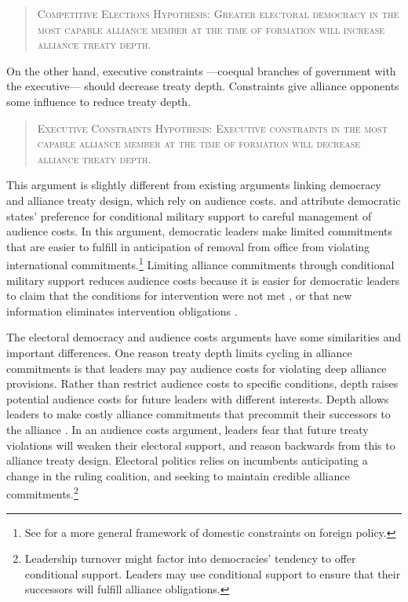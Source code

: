 \documentclass[12pt]{article}
\begin{document}
\begin{quote}
\textsc{Competitive Elections Hypothesis: Greater electoral democracy in the most capable alliance member at the time of formation will increase alliance treaty depth.}
\end{quote}   

On the other hand, executive constraints ---coequal branches of government with the executive--- should decrease treaty depth. 
Constraints give alliance opponents some influence to reduce treaty depth. 


\begin{quote}
\textsc{Executive Constraints Hypothesis: Executive constraints in the most capable alliance member at the time of formation will decrease alliance treaty depth.}
\end{quote}   


This argument is slightly different from existing arguments linking democracy and alliance treaty design, which rely on audience costs. 
\citet{Mattes2012} and \citet{Chibaetal2015} attribute democratic states' preference for conditional military support to careful management of audience costs. 
In this argument, democratic leaders make limited commitments that are easier to fulfill in anticipation of removal from office from violating international commitments.\footnote{See \citet{HydeSaunders2020} for a more general framework of domestic constraints on foreign policy.} 
Limiting alliance commitments through conditional military support reduces audience costs because it is easier for democratic leaders to claim that the conditions for intervention were not met \citep{FjelstulReiter2019}, or that new information eliminates intervention obligations \citep{LevenduskyHorowitz2012}. 


The electoral democracy and audience costs arguments have some similarities and important differences. 
One reason treaty depth limits cycling in alliance commitments is that leaders may pay audience costs for violating deep alliance provisions. 
Rather than restrict audience costs to specific conditions, depth raises potential audience costs for future leaders with different interests. 
Depth allows leaders to make costly alliance commitments that precommit their successors to the alliance \citep{Mattes2012a}. 
In an audience costs argument, leaders fear that future treaty violations will weaken their electoral support, and reason backwards from this to alliance treaty design. 
Electoral politics relies on incumbents anticipating a change in the ruling coalition, and seeking to maintain credible alliance commitments.\footnote{Leadership turnover might factor into democracies' tendency to offer conditional support. Leaders may use conditional support to ensure that their successors will fulfill alliance obligations.} 
\end{document}
